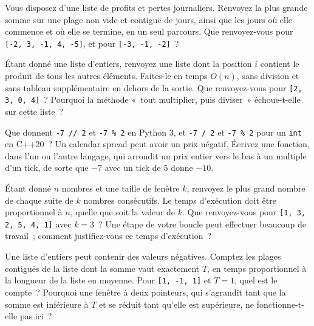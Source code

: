 \begin{question}\label{iq:iv3:algorithms:14}
Vous disposez d'une liste de profits et pertes journaliers. Renvoyez la plus grande somme sur une plage non vide et contiguë de jours, ainsi que les jours où elle commence et où elle se termine, en un seul parcours. Que renvoyez-vous pour \texttt{[-2, 3, -1, 4, -5]}, et pour \texttt{[-3, -1, -2]}~?
\end{question}

\begin{question}\label{iq:iv3:algorithms:15}
Étant donné une liste d'entiers, renvoyez une liste dont la position $i$ contient le produit de tous les autres éléments. Faites-le en temps $O(n)$, sans division et sans tableau supplémentaire en dehors de la sortie. Que renvoyez-vous pour \texttt{[2, 3, 0, 4]}~? Pourquoi la méthode «~tout multiplier, puis diviser~» échoue-t-elle sur cette liste~?
\end{question}

\begin{question}\label{iq:iv3:algorithms:16}
Que donnent \texttt{-7 // 2} et \texttt{-7 \% 2} en Python 3, et \texttt{-7 / 2} et \texttt{-7 \% 2} pour un \texttt{int} en C++20~? Un calendar spread peut avoir un prix négatif. Écrivez une fonction, dans l'un ou l'autre langage, qui arrondit un prix entier vers le bas à un multiple d'un tick, de sorte que $-7$ avec un tick de 5 donne $-10$.
\end{question}

\begin{question}\label{iq:iv3:algorithms:17}
Étant donné $n$ nombres et une taille de fenêtre $k$, renvoyez le plus grand nombre de chaque suite de $k$ nombres consécutifs. Le temps d'exécution doit être proportionnel à $n$, quelle que soit la valeur de $k$. Que renvoyez-vous pour \texttt{[1, 3, 2, 5, 4, 1]} avec $k = 3$~? Une étape de votre boucle peut effectuer beaucoup de travail~; comment justifiez-vous ce temps d'exécution~?
\end{question}

\begin{question}\label{iq:iv3:algorithms:18}
Une liste d'entiers peut contenir des valeurs négatives. Comptez les plages contiguës de la liste dont la somme vaut exactement $T$, en temps proportionnel à la longueur de la liste en moyenne. Pour \texttt{[1, -1, 1]} et $T = 1$, quel est le compte~? Pourquoi une fenêtre à deux pointeurs, qui s'agrandit tant que la somme est inférieure à $T$ et se réduit tant qu'elle est supérieure, ne fonctionne-t-elle pas ici~?
\end{question}

